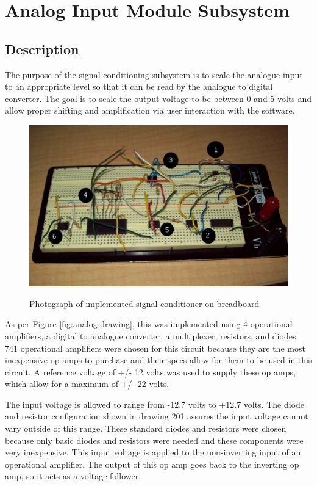 \section[Analog Input]{Analog Input Module Subsystem}
\subsection{Description}
The purpose of the signal conditioning subsystem is to scale the analogue input
 to an appropriate level so that it can be read by the analogue to digital 
converter. The goal is to scale the output voltage to be between 0 and 5 volts 
and allow proper shifting and amplification via user interaction with the 
software.

 \begin{figure}[hbp]
\caption{Photograph of implemented signal conditioner on breadboard}
\includegraphics[width=5in]{sub_analog_hw.jpg}
\label{fig:analog breadboard}
\end{figure}


As per Figure \ref{fig:analog drawing}, this was implemented using 4 
operational amplifiers, a digital to analogue converter, a multiplexer, 
resistors, and diodes. 741 operational amplifiers were chosen for this circuit 
because they are the most inexpensive op amps to purchase and their specs allow
 for them to be used in this circuit. A reference voltage of +/- 12 volts was 
used to supply these op amps, which allow for a maximum of +/- 22 
volts\cite{ds:741-op-amp}.

The input voltage is allowed to range from -12.7 volts to +12.7 volts. The 
diode and resistor configuration shown in drawing 201 assures the input voltage
 cannot vary outside of this range. These standard diodes and resistors were 
chosen because only basic diodes and resistors were needed and these components
 were very inexpensive. This input voltage is applied to the non-inverting 
input of an operational amplifier. The output of this op amp goes back to the 
inverting op amp, so it acts as a voltage follower\cite{bk:olia}.

